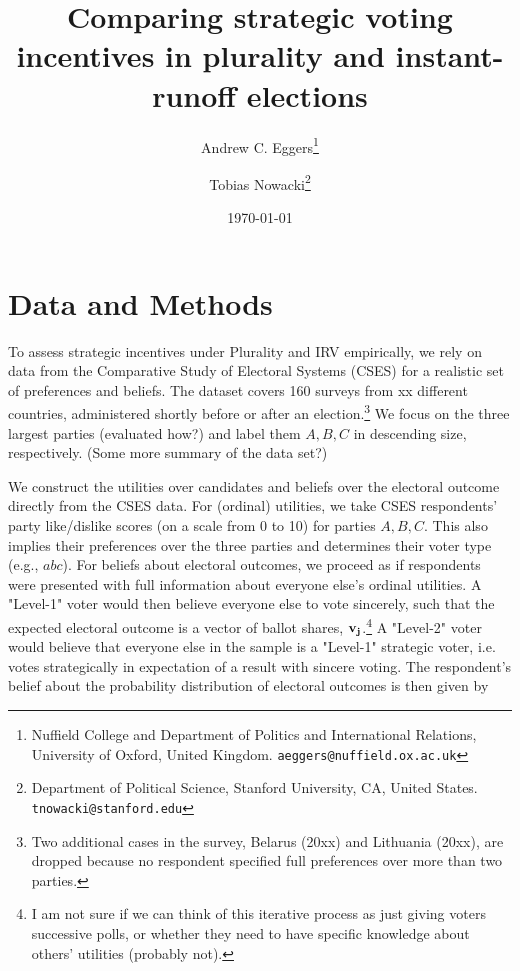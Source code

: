 \documentclass[12pt, letter]{article}
\begin{document}
\author{Andrew C. Eggers\thanks{Nuffield College and Department of Politics and International Relations, University of Oxford, United Kingdom. \texttt{aeggers@nuffield.ox.ac.uk}}
\and
Tobias Nowacki\thanks{Department of Political Science, Stanford University, CA, United States. \texttt{tnowacki@stanford.edu}}}
\date{\today}
\title{Comparing strategic voting incentives in plurality and instant-runoff elections}

\maketitle

\onehalfspacing %

\setcounter{section}{4}

\section{Data and Methods}

To assess strategic incentives under Plurality and IRV empirically, we rely on data from the  Comparative Study of Electoral Systems (CSES) for a realistic set of preferences and beliefs. The dataset covers 160 surveys from xx different countries, administered shortly before or after an election.\footnote{Two additional cases in the survey, Belarus (20xx) and Lithuania (20xx), are dropped because no respondent specified full preferences over more than two parties.} We focus on the three largest parties (evaluated how?) and label them $A, B, C$ in descending size, respectively. (Some more summary of the data set?)

We construct the utilities over candidates and beliefs over the electoral outcome directly from the CSES data. For (ordinal) utilities, we take CSES respondents' party like/dislike scores (on a scale from 0 to 10) for parties $A, B, C$. This also implies their preferences over the three parties and determines their voter type (e.g., $abc$). For beliefs about electoral outcomes, we proceed as if respondents were presented with full information about everyone else's ordinal utilities. A "Level-1" voter would then believe everyone else to vote sincerely, such that the expected electoral outcome is a vector of ballot shares, $\bf v_j$.\footnote{I am not sure if we can think of this iterative process as just giving voters successive polls, or whether they need to have specific knowledge about others' utilities (probably not).} A "Level-2" voter would believe that everyone else in the sample is a "Level-1" strategic voter, i.e. votes strategically in expectation of a result with sincere voting. The respondent's belief about the probability distribution of electoral outcomes is then given by
\end{document}

